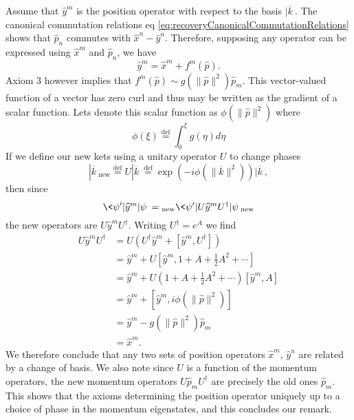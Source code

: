 \begin{rmk}
Assume that $\widehat{y}^{m}$ is the position operator with
respect to the basis $|\overline{k}\>$. The canonical commutation
relations eq \eqref{eq:recoveryCanonicalCommutationRelations}
shows that $\widehat{p}_{n}$ commutes with
$\widehat{x}^{n}-\widehat{y}^{n}$. Therefore, supposing any operator can
be expressed using $\widehat{x}^{m}$ and $\widehat{p}_{n}$, we
have
\begin{equation}%
\widehat{y}^{m} = \widehat{x}^{m}+f^{m}(\widehat{p}).
\end{equation}
Axiom 3 however implies that $f^{m}(\widehat{p})\sim
g(\|\widehat{p}\|^{2})\widehat{p}_{m}$. This vector-valued
function of a vector has zero curl and thus may be written as the
gradient of a scalar function. Lets denote this scalar function
as $\phi(\|\widehat{p}\|^{2})$ where 
\begin{equation}%
\phi(\xi)\stackrel{\text{def}}{=}\int^{\xi}_{0}g(\eta)d\eta
\end{equation}
If we define our new kets using a unitary operator $U$ to change
phases
\begin{equation}%
|\overline{k}\>_{\text{new}}\stackrel{\text{def}}{=}U|\overline{k}\>\stackrel{\text{def}}{=}\exp(-i\phi(\|\overline{k}\|^{2}))|\overline{k}\>,
\end{equation}
then since
\begin{equation}%
\<\psi'|\widehat{y}^{m}|\psi\> = {}_\text{new}\<\psi'|U\widehat{y}^{m}U^{\dag}|\psi\>_\text{new}
\end{equation}
the new operators are $U\widehat{y}^{m}U^{\dag}$. Writing
$U^{\dag}=e^{A}$ we find
\begin{subequations}
\begin{align}
U\widehat{y}^{m}U^{\dag} &= U\left(U^{\dag}\widehat{y}^{m}+[\widehat{y}^{m},U^{\dag}]\right)\\
&= \widehat{y}^{m} +
U[\widehat{y}^{m},1+A+\frac{1}{2}A^{2}+\cdots]\\
&= \widehat{y}^{m} + U(1+A+\frac{1}{2}A^{2}+\cdots)[\widehat{y}^{m},A]\\
&= \widehat{y}^{m} +
[\widehat{y}^{m},i\phi(\|\widehat{p}\|^{2})]\\
&= \widehat{y}^{m} - g(\|\widehat{p}\|^{2})\widehat{p}_{m}\\
&= \widehat{x}^{m}.
\end{align}
\end{subequations}
We therefore conclude that any two sets of position operators
$\widehat{x}^{m}$, $\widehat{y}^{n}$ are related by a change of
basis. We also note since $U$ is a function of the momentum
operators, the new momentum operators $U\widehat{p}_{m}U^{\dag}$
are precisely the old ones $\widehat{p}_{m}$. This shows that the
axioms determining the position operator uniquely up to a choice
of phase in the momentum eigenstates, and this concludes our remark.
\end{rmk}

